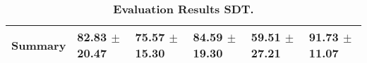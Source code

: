 \begin{table}[htb]
{\begin{tabular}{llllll}
\midrule
\textbf{Summary                                  } &                  \phantom{0}82.83 $\pm$ 20.47 &                      \phantom{0}75.57 $\pm$ 15.30 &                  \phantom{0}84.59 $\pm$ 19.30 &                  \phantom{0}59.51 $\pm$ 27.21 &            \phantom{0}91.73 $\pm$ 11.07 \\
\bottomrule
\end{tabular}%
}
\caption{\textbf{Evaluation Results SDT.}}
\label{tab:eval-results}
\end{table}
\newpage 
